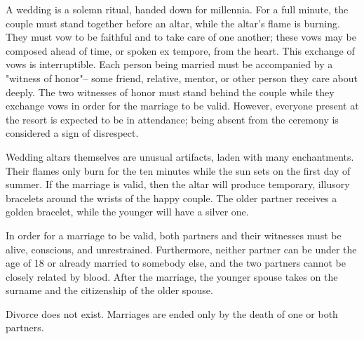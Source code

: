 \documentclass[green]{Kos}
\begin{document}
\name{\gWedding{}}

A wedding is a solemn ritual, handed down for millennia. For a full minute, the couple must stand together before an altar, while the altar's flame is burning. They must vow to be faithful and to take care of one another; these vows may be composed ahead of time, or spoken ex tempore, from the heart. This exchange of vows is interruptible. Each person being married must be accompanied by a "witness of honor"-- some friend, relative, mentor, or other person they care about deeply. The two witnesses of honor must stand behind the couple while they exchange vows in order for the marriage to be valid. However, everyone present at the resort is expected to be in attendance; being absent from the ceremony is considered a sign of disrespect.

Wedding altars themselves are unusual artifacts, laden with many enchantments. Their flames only burn for the ten minutes while the sun sets on the first day of summer. If the marriage is valid, then the altar will produce temporary, illusory bracelets around the wrists of the happy couple. The older partner receives a golden bracelet, while the younger will have a silver one.

In order for a marriage to be valid, both partners and their witnesses must be alive, conscious, and unrestrained. Furthermore, neither partner can be under the age of 18 or already married to somebody else, and the two partners cannot be closely related by blood. After the marriage, the younger spouse takes on the surname and the citizenship of the older spouse.

Divorce does not exist. Marriages are ended only by the death of one or both partners.
\end{document}
